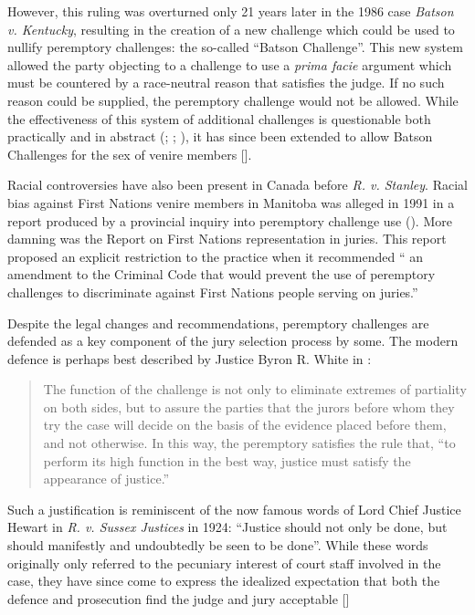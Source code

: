 However, this ruling was overturned only 21 years later in the 1986 case \textit{Batson v. Kentucky}, resulting in the creation of a new challenge which
could be used to nullify peremptory challenges: the so-called ``Batson Challenge''. This new system allowed the
party objecting to a challenge to use a \textit{prima facie} argument which must be countered by a race-neutral reason that
satisfies the judge. If no such reason could be supplied, the peremptory challenge would not be allowed. While the
effectiveness of this system of additional challenges is questionable both practically and in abstract (\cite{page2005};
\cite{morehead1994}; \cite{hoffman1997}), it has since been extended to allow Batson
Challenges for the sex of venire members [\cite{jebvalabama}].

Racial controversies have also been present in Canada before \textit{R. v. Stanley}. Racial bias against First Nations
venire members in Manitoba was alleged in 1991 in a report produced by a provincial inquiry into peremptory challenge use (\cite{goodfirststep}). More damning was the \citeauthor{iacobuccireport} Report on First Nations representation in
juries. This report proposed an explicit restriction to the practice when it recommended `` an amendment to the Criminal Code that would prevent the use of peremptory challenges to discriminate against First Nations people serving on juries.''

Despite the legal changes and recommendations, peremptory challenges are
defended as a key component of the jury selection process by some. The modern defence is perhaps best described by Justice Byron
R. White in \cite{swainvalabama}:

\begin{quote}
The function of the challenge is not only to eliminate extremes of partiality on both sides, but to assure the parties that the
jurors before whom they try the case will decide on the basis of the evidence placed before them, and not otherwise. In this way,
the peremptory satisfies the rule that, ``to perform its high function in the best way, justice must satisfy the appearance of
justice.''
\end{quote}

Such a justification is reminiscent of the now famous words of Lord Chief Justice Hewart in \textit{R. v. Sussex Justices} in 1924:
``Justice should not only be done, but should manifestly and undoubtedly be seen to be done''. While these words originally only referred to the pecuniary interest of court staff involved in the case, they
have since come to express the idealized expectation that both the defence and prosecution find the judge and jury acceptable [\cite{oakes2016}]

